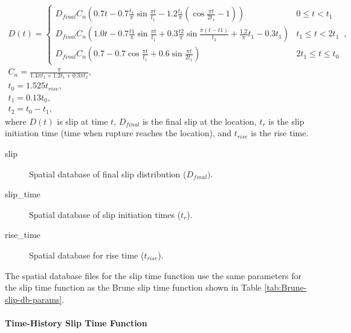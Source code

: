 \begin{gather}
D(t)=\left\{ \begin{array}{cc}
D_{\mathit{final}}C_{n}\left(0.7t-0.7\frac{t_{1}}{\pi}\sin\frac{\pi t}{t_{1}}-1.2\frac{t_{1}}{\pi}\left(\cos\frac{\pi t}{2t_{1}}-1\right)\right) & 0\leq t<t_{1}\\
D_{\mathit{final}}C_{n}\left(1.0t-0.7\frac{t1}{\pi}\sin\frac{\pi t}{t_{1}}+0.3\frac{t2}{\pi}\sin\frac{\pi(t-t1)}{t_{2}}+\frac{1.2}{\pi}t_{1}-0.3t_{1}\right) & t_{1}\leq t<2t_{1}\\
D_{\mathit{final}}C_{n}\left(0.7-0.7\cos\frac{\pi t}{t_{1}}+0.6\sin\frac{\pi t}{2t_{1}}\right) & 2t_{1}\leq t\leq t_{0}
\end{array}\right.\,,\\
C_{n}=\frac{\pi}{1.4\pi t_{1}+1.2t_{1}+0.3\pi t_{2}},\\
t_{0}=1.525t_{\mathit{rise}},\\
t_{1}=0.13t_{0},\\
t_{2}=t_{0}-t_{1},
\end{gather}
where $D(t)$ is slip at time $t$, $D_{final}$ is the final slip
at the location, $t_{r}$ is the slip initiation time (time when rupture
reaches the location), and $t_{\mathit{rise}}$ is the rise time.
\begin{description}
\item [{slip}] Spatial database of final slip distribution ($D_{final})$.
\item [{slip\_time}] Spatial database of slip initiation times ($t_{r}$).
\item [{rise\_time}] Spatial database for rise time ($t_{\mathit{rise}}$).
\end{description}
The spatial database files for the slip time function use the same
parameters for the slip time function as the Brune slip time function
shown in Table \vref{tab:Brune-slip-db-params}.


\paragraph{Time-History Slip Time Function}


